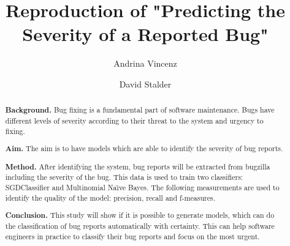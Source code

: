 \documentclass[sigconf,screen]{acmart}
\begin{document}
\title{Reproduction of "Predicting the Severity of a Reported Bug"}

\author{Andrina Vincenz}

\author{David Stalder}


\renewcommand{\shortauthors}{Andrina Vincenz, David Stalder}

\begin{abstract}
	
	\textbf{Background.} Bug fixing is a fundamental part of software maintenance. Bugs have different levels of severity according to their threat to the system and urgency to fixing.
	
	\textbf{Aim.} The aim is to have models which are able to identify the severity of bug reports.
	
	\textbf{Method.} After identifying the system, bug reports will be extracted from bugzilla including the severity of the bug. This data is used to train two classifiers: SGDClassifier and Multinomial Na{\"\i}ve Bayes. The following measurements are used to identify the quality of the model: precision, recall and f-measures.
	
	\textbf{Conclusion.} This study will show if it is possible to generate models, which can do the classification of bug reports automatically with certainty. This can help software engineers in practice to classify their bug reports and focus on the most urgent.
\end{abstract}


\maketitle
\end{document}
